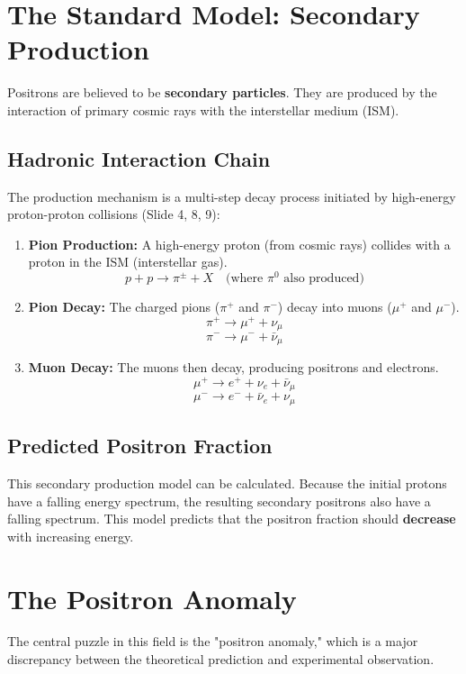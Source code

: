 \documentclass{sciposter}
\begin{document}
\begin{multicols}{3}
\section{The Standard Model: Secondary Production}
Positrons are believed to be \textbf{secondary particles}. They are produced by the interaction of primary cosmic rays with the interstellar medium (ISM).

\subsection{Hadronic Interaction Chain}
The production mechanism is a multi-step decay process initiated by high-energy proton-proton collisions (Slide 4, 8, 9):
\begin{enumerate}
    \item \textbf{Pion Production:} A high-energy proton (from cosmic rays) collides with a proton in the ISM (interstellar gas).
    $$ p + p \rightarrow \pi^{\pm} + X \quad (\text{where } \pi^0 \text{ also produced)} $$
    
    \item \textbf{Pion Decay:} The charged pions ($\pi^+$ and $\pi^-$) decay into muons ($\mu^+$ and $\mu^-$).
    $$ \pi^+ \rightarrow \mu^+ + \nu_{\mu} $$
    $$ \pi^- \rightarrow \mu^- + \bar{\nu}_{\mu} $$
    
    \item \textbf{Muon Decay:} The muons then decay, producing positrons and electrons.
    $$ \mu^+ \rightarrow e^+ + \nu_e + \bar{\nu}_{\mu} $$
    $$ \mu^- \rightarrow e^- + \bar{\nu}_e + \nu_{\mu} $$
\end{enumerate}

\subsection{Predicted Positron Fraction}
This secondary production model can be calculated. Because the initial protons have a falling energy spectrum, the resulting secondary positrons also have a falling spectrum. This model predicts that the positron fraction should \textbf{decrease} with increasing energy.

\section{The Positron Anomaly}
The central puzzle in this field is the "positron anomaly," which is a major discrepancy between the theoretical prediction and experimental observation.


\end{multicols}
\end{document}
